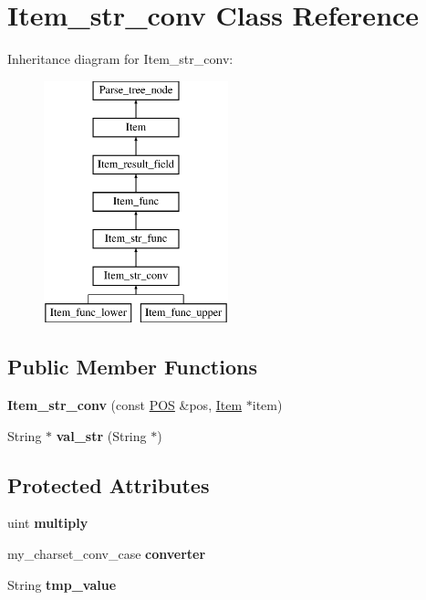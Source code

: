 \hypertarget{classItem__str__conv}{}\section{Item\+\_\+str\+\_\+conv Class Reference}
\label{classItem__str__conv}
Inheritance diagram for Item\+\_\+str\+\_\+conv\+:\begin{figure}[H]
\begin{center}
\leavevmode
\includegraphics[height=7.000000cm]{classItem__str__conv}
\end{center}
\end{figure}
\subsection*{Public Member Functions}
\begin{DoxyCompactItemize}
\item 
\mbox{\label{classItem__str__conv_a2f9e4e765aa5c2820315088894e09404}} 
{\bfseries Item\+\_\+str\+\_\+conv} (const \mbox{\hyperlink{structYYLTYPE}{P\+OS}} \&pos, \mbox{\hyperlink{classItem}{Item}} $\ast$item)
\item 
\mbox{\label{classItem__str__conv_af62c86ba5cfa653fc3ee7c6748fcd107}} 
String $\ast$ {\bfseries val\+\_\+str} (String $\ast$)
\end{DoxyCompactItemize}
\subsection*{Protected Attributes}
\begin{DoxyCompactItemize}
\item 
\mbox{\label{classItem__str__conv_ae088ecabb6c1a850c1a111bcc7f71fe8}} 
uint {\bfseries multiply}
\item 
\mbox{\label{classItem__str__conv_ae604dc8ef73bc1cea11ad0f6a65b37ad}} 
my\+\_\+charset\+\_\+conv\+\_\+case {\bfseries converter}
\item 
\mbox{\label{classItem__str__conv_a7fc97a21155aed16ac18aa3095c4d34e}} 
String {\bfseries tmp\+\_\+value}
\end{DoxyCompactItemize}
